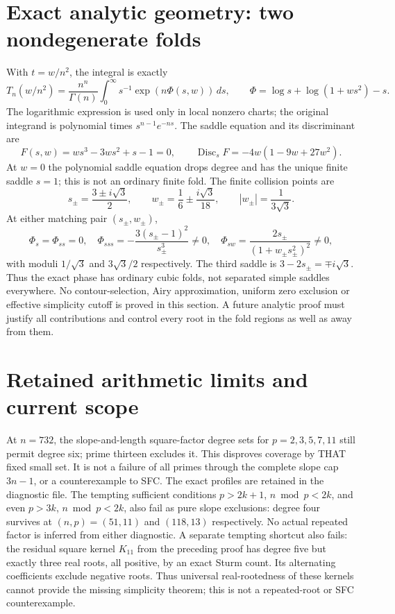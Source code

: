 \documentclass[11pt]{article}
\begin{document}
\section{Exact analytic geometry: two nondegenerate folds}
With $t=w/n^2$, the integral is exactly
\[
 T_n(w/n^2)=\frac{n^n}{\Gamma(n)}
 \int_0^\infty s^{-1}\exp(n\Phi(s,w))\,ds,
 \qquad \Phi=\log s+\log(1+ws^2)-s.                       \tag{7}
\]
The logarithmic expression is used only in local nonzero charts;
the original integrand is polynomial times $s^{n-1}e^{-ns}$.
The saddle equation and its discriminant are
\[
 F(s,w)=ws^3-3ws^2+s-1=0,\qquad
 \operatorname{Disc}_s F=-4w(1-9w+27w^2).                 \tag{8}
\]
At $w=0$ the polynomial saddle equation drops degree and has the unique
finite saddle $s=1$; this is not an ordinary finite fold.
The finite collision points are
\[
 s_\pm=\frac{3\pm i\sqrt3}2,\qquad
 w_\pm=\frac16\pm\frac{i\sqrt3}{18},\qquad
 |w_\pm|=\frac1{3\sqrt3}.                                \tag{9}
\]
At either matching pair $(s_\pm,w_\pm)$,
\[
 \Phi_s=\Phi_{ss}=0,\quad
 \Phi_{sss}=-\frac{3(s_\pm-1)^2}{s_\pm^3}\ne0,
 \quad \Phi_{sw}=\frac{2s_\pm}{(1+w_\pm s_\pm^2)^2}\ne0,
                                                               \tag{10}
\]
with moduli $1/\sqrt3$ and $3\sqrt3/2$ respectively.
The third saddle is $3-2s_\pm=\mp i\sqrt3$.
Thus the exact phase has ordinary cubic folds, not separated simple
saddles everywhere. No contour-selection, Airy approximation, uniform
zero exclusion or effective simplicity cutoff is proved in this section.
A future analytic proof must justify all contributions and control every
root in the fold regions as well as away from them.

\section{Retained arithmetic limits and current scope}
At $n=732$, the slope-and-length square-factor degree sets for
$p=2,3,5,7,11$ still permit degree six; prime thirteen excludes it.
This disproves coverage by THAT fixed small set. It is not a failure of
all primes through the complete slope cap $3n-1$, or a counterexample
to SFC. The exact profiles are retained in the diagnostic file.
The tempting sufficient conditions $p>2k+1$, $n\bmod p<2k$, and even
$p>3k$, $n\bmod p<2k$, also fail as pure slope exclusions: degree four
survives at $(n,p)=(51,11)$ and $(118,13)$ respectively.
No actual repeated factor is inferred from either diagnostic.
A separate tempting shortcut also fails: the residual square kernel
$K_{11}$ from the preceding proof has degree five but exactly three real
roots, all positive, by an exact Sturm count. Its alternating coefficients
exclude negative roots. Thus universal real-rootedness of these kernels
cannot provide the missing simplicity theorem; this is not a repeated-root
or SFC counterexample.
\end{document}
